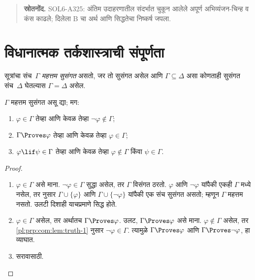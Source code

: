\begin{quote}\small\textbf{स्रोतनोंद.} SOL6-A325: अंतिम उदाहरणातील संदर्भात चुकून आलेले अपूर्ण अभिव्यंजन-चिन्ह व कंस काढले; दिलेला B चा अर्थ आणि सिद्धतेचा निष्कर्ष जपला.\end{quote}











\section{विधानात्मक तर्कशास्त्राची संपूर्णता}\label{pl:prp:com:sec}

\begin{defn}
\label{pl:prp:com:def:MaxCon}
सूत्रांचा संच~$\Gamma$ \emph{महत्तम सुसंगत} असतो, जर तो
सुसंगत असेल आणि $\Gamma \subseteq \Delta$ असा कोणताही सुसंगत
संच~$\Delta$ घेतल्यास $\Gamma = \Delta$ असेल.
\end{defn}

\begin{lem}[सत्यता पूर्वप्रमेय]
  \label{pl:prp:com:lem:truth}
$\Gamma$ महत्तम सुसंगत असू द्या; मग:
\begin{enumerate}
\item \label{pl:prp:com:lem:truth-1} $\varphi \in \Gamma$ तेव्हा आणि केवळ तेव्हा $\lnot \varphi
  \notin \Gamma$;
\item \label{pl:prp:com:lem:truth-2} $\Gamma \Proves \varphi$ तेव्हा आणि केवळ तेव्हा $\varphi \in \Gamma$;
\item \label{pl:prp:com:lem:truth-3} $\varphi \lif \psi \in \Gamma$ तेव्हा आणि केवळ तेव्हा
  $\varphi \notin \Gamma$ किंवा $\psi \in \Gamma$.
\end{enumerate}
\end{lem}

\begin{proof}
\begin{enumerate}
\item $\varphi \in \Gamma$ असे माना. $\lnot \varphi \in \Gamma$ सुद्धा असेल,
  तर $\Gamma$ विसंगत ठरतो. $\varphi$ आणि $\lnot\varphi$ यांपैकी एकही
  $\Gamma$ मध्ये नसेल, तर  नुसार
  $\Gamma\cup\{\varphi\}$ आणि $\Gamma \cup \{\lnot \varphi\}$ यांपैकी
  एक संच सुसंगत असतो; म्हणून $\Gamma$ महत्तम नसतो. उलटी दिशाही
  याचप्रमाणे सिद्ध होते.
\item $\varphi \in \Gamma$ असेल, तर अर्थातच $\Gamma \Proves \varphi$.
  उलट, $\Gamma \Proves \varphi$ असे माना. $\varphi \notin \Gamma$ असेल,
  तर \ref{pl:prp:com:lem:truth-1} नुसार $\lnot \varphi \in \Gamma$. त्यामुळे
  $\Gamma \Proves \varphi$ आणि $\Gamma \Proves \lnot \varphi$, हा व्याघात.
\item सरावासाठी.
\end{enumerate}
\end{proof}

